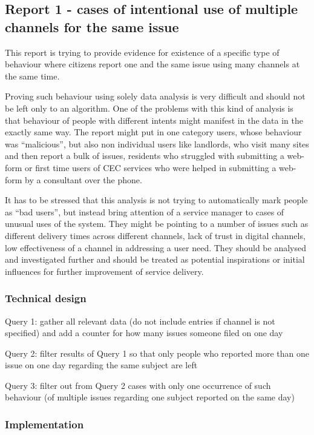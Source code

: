 		\subsection{Report 1 - cases of intentional use of multiple channels for the same issue}
		
This report is trying to provide evidence for existence of a specific type of behaviour where citizens report one and the same issue using many channels at the same time.

Proving such behaviour using solely data analysis is very difficult and should not be left only to an algorithm. One of the problems with this kind of analysis is that behaviour of people with different intents might manifest in the data in the exactly same way. The report might put in one category users, whose behaviour was “malicious”, but also non individual users like landlords, who visit many sites and then report a bulk of issues, residents who struggled with submitting a web-form or first time users of CEC services who were helped in submitting a web-form by a consultant over the phone.

It has to be stressed that this analysis is not trying to automatically mark people as “bad users”, but instead bring attention of a service manager to cases of unusual uses of the system. They might be pointing to a number of issues such as different delivery times across different channels, lack of trust in digital channels, low effectiveness of a channel in addressing a user need. They should be analysed and investigated further and should be treated as potential inspirations or initial influences for further improvement of service delivery.

			\subsubsection{Technical design}
			
Query 1: gather all relevant data (do not include entries if channel is not specified) and add a counter for how many issues someone filed on one day

Query 2: filter results of Query 1 so that only people who reported more than one issue on one day regarding the same subject are left

Query 3: filter out from Query 2 cases with only one occurrence of such behaviour (of multiple issues regarding one subject reported on the same day)

			\subsubsection{Implementation}
			
